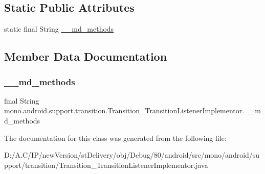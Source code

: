 \subsection*{Static Public Attributes}
\begin{DoxyCompactItemize}
\item 
static final String \hyperlink{classmono_1_1android_1_1support_1_1transition_1_1_transition___transition_listener_implementor_ab6b0828df9171762b499bd4c4d860c22}{\+\_\+\+\_\+md\+\_\+methods}
\end{DoxyCompactItemize}


\subsection{Member Data Documentation}
\mbox{\label{classmono_1_1android_1_1support_1_1transition_1_1_transition___transition_listener_implementor_ab6b0828df9171762b499bd4c4d860c22}} 
\subsubsection{\texorpdfstring{\+\_\+\+\_\+md\+\_\+methods}{\_\_md\_methods}}
{\footnotesize\ttfamily final String mono.\+android.\+support.\+transition.\+Transition\+\_\+\+Transition\+Listener\+Implementor.\+\_\+\+\_\+md\+\_\+methods\hspace{0.3cm}{\ttfamily [static]}}



The documentation for this class was generated from the following file\+:\begin{DoxyCompactItemize}
\item 
D\+:/\+A.\+C/\+I\+P/new\+Version/st\+Delivery/obj/\+Debug/80/android/src/mono/android/support/transition/Transition\+\_\+\+Transition\+Listener\+Implementor.\+java\end{DoxyCompactItemize}
